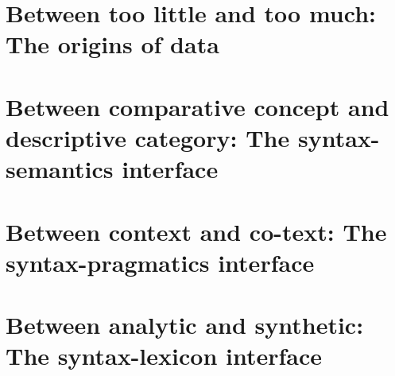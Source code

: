 \documentclass[output=book,collection
            ,chinesefont
		  ]{langscibook}
\begin{document}
\maketitle
\frontmatter

{\sloppy\tableofcontents}

%

\mainmatter



\part{Between too little and too much: The origins of data}

\renewcommand{\lsChapterFooterSize}{\footnotesize}

\part{Between comparative concept and descriptive category: The syntax-semantics interface}

\renewcommand{\lsChapterFooterSize}{\scriptsize}
\renewcommand{\lsChapterFooterSize}{\footnotesize}

\part{Between context and co-text: The syntax-pragmatics interface}


\part{Between analytic and synthetic: The syntax-lexicon interface}


\backmatter




\end{document}
